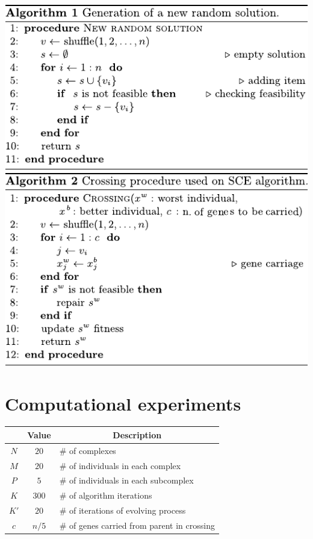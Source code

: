 \documentclass[a0,portrait]{a0poster}
\newcommand{\spc}{\phantom{a}}
\begin{document}
\begin{multicols}{2}
\begin{center}
\begin{minipage}{0.30\linewidth}
    \includegraphics[scale=1.5]{alg-new}
	\\[1cm]
    \includegraphics[scale=1.5]{alg-cross}
  \label{fig:alg-new}
\end{minipage}
\end{center}

\section*{Computational experiments}




  \begin{tabular}{|c|c|l|}
  \hline
  \multicolumn{1}{|c}{\rule{0pt}{12pt} \spc } & \multicolumn{1}{|c|}{\bf \spc Value \spc } & \multicolumn{1}{c|}{\bf Description} \\[2pt]
  \hline\rule{0pt}{12pt}
  $N$  & $20$  & \spc \# of complexes \\
  $M$  & $20$  & \spc \# of individuals in each complex \\
  $P$  & $5$   & \spc \# of individuals in each subcomplex \\
  $K$  & $300$ & \spc \# of algorithm iterations \\
  $K'$ & $20$  & \spc \# of iterations of evolving process \\
  $c$  & $n/5$ & \spc \# of genes carried from parent in crossing \\[2pt]
  \hline
  \end{tabular}
  \label{tab:params}




\end{multicols}
\end{document}
